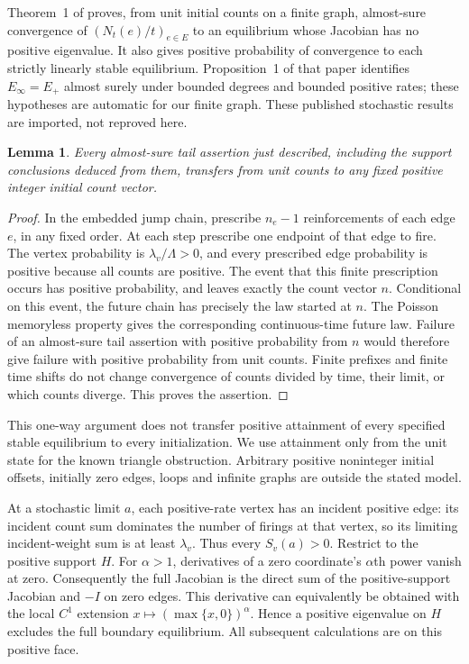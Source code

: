 \documentclass[11pt]{article}
\newtheorem{lemma}[theorem]{Lemma}
\begin{document}
Theorem~1 of \cite[printed p.~3016]{HHK} proves, from unit initial counts
on a finite graph, almost-sure convergence of $(N_t(e)/t)_{e\in E}$ to
an equilibrium whose Jacobian has no positive eigenvalue. It also gives
positive probability of convergence to each strictly linearly stable
equilibrium. Proposition~1 of that paper identifies $E_\infty=E_+$
almost surely under bounded degrees and bounded positive rates; these
hypotheses are automatic for our finite graph.
These published stochastic results are imported, not reproved here.

\begin{lemma}\label{initial}
Every almost-sure tail assertion just described, including the support
conclusions deduced from them, transfers from unit counts to any fixed
positive integer initial count vector.
\end{lemma}
\begin{proof}
In the embedded jump chain, prescribe $n_e-1$ reinforcements of each edge
$e$, in any fixed order. At each step prescribe one endpoint of that edge
to fire. The vertex probability is $\lambda_v/\Lambda>0$, and every
prescribed edge probability is positive because all counts are positive.
The event that this finite prescription occurs has positive probability,
and leaves exactly the count vector $n$.
Conditional on this event, the future chain has precisely the law started
at $n$. The Poisson memoryless property gives the corresponding
continuous-time future law. Failure of an almost-sure tail assertion with
positive probability from $n$ would therefore give failure with positive
probability from unit counts. Finite prefixes and finite time shifts do
not change convergence of counts divided by time, their limit, or which
counts diverge. This proves the assertion.
\end{proof}
This one-way argument does not transfer positive attainment of every
specified stable equilibrium to every initialization. We use attainment
only from the unit state for the known triangle obstruction.
Arbitrary positive noninteger initial offsets, initially zero edges,
loops and infinite graphs are outside the stated model.

At a stochastic limit $a$, each positive-rate vertex has an incident
positive edge: its incident count sum dominates the number of firings
at that vertex, so its limiting incident-weight sum is at least
$\lambda_v$. Thus every $S_v(a)>0$. Restrict to the positive support $H$.
For $\alpha>1$, derivatives of a zero coordinate's $\alpha$th power
vanish at zero. Consequently the full Jacobian is the direct sum of
the positive-support Jacobian and $-I$ on zero edges. This derivative
can equivalently be obtained with the local $C^1$ extension
$x\mapsto(\max\{x,0\})^\alpha$. Hence a positive eigenvalue on $H$
excludes the full boundary equilibrium. All subsequent calculations
are on this positive face.
\end{document}
